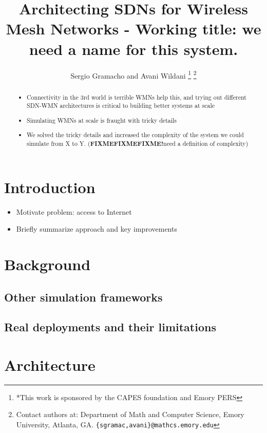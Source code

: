 \documentclass[letterpaper, 10 pt, conference]{ieeeconf}  %
\title{\LARGE \bf
Architecting SDNs for Wireless Mesh Networks \fixme - Working title: we need a name for this system.
}
\author{Sergio Gramacho and Avani Wildani%
\thanks{*This work is sponsored by the CAPES foundation and Emory PERS}%
\thanks{Contact authors at: Department of Math and Computer Science,
        Emory University, Atlanta, GA.
        {\tt\small \{sgramac,avani\}@mathcs.emory.edu}}%
}
\newcommand{\fixme}{\large\textbf{FIXMEFIXMEFIXME!}\normalsize}
\begin{document}
\maketitle
\thispagestyle{empty}
\pagestyle{empty}


\begin{abstract}

\begin{itemize}
    \item Connectivity in the 3rd world is terrible
    \items WMNs help this, and trying out different SDN-WMN architectures is critical to building better systems at scale
    \item Simulating WMNs at scale is fraught with tricky details
    \item We solved the tricky details and increased the complexity of the system we could simulate from X to Y. (\fixme need a definition of complexity) 
\end{itemize}
\end{abstract}


\section{Introduction}

\begin{itemize}
    \item Motivate problem: access to Internet
    \item Briefly summarize approach and key improvements
\end{itemize}

\section{Background}

\subsection{Other simulation frameworks}
\subsection{Real deployments and their limitations}

\section{Architecture}
\end{document}
